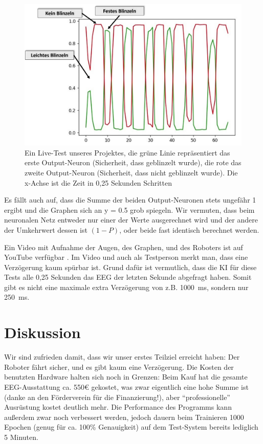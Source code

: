 \documentclass[11pt]{scrartcl}
\begin{document}
	\begin{figure}[h!]
		\includegraphics[width=\textwidth]{pictures/Test-Graph-annotated.png}
		\caption{Ein Live-Test unseres Projektes, die grüne Linie repräsentiert das erste Output-Neuron (Sicherheit, dass geblinzelt wurde), die rote das zweite Output-Neuron (Sicherheit, dass nicht geblinzelt wurde). Die x-Achse ist die Zeit in 0,25 Sekunden Schritten}
		\label{test-graph}
	\end{figure}

	Es fällt auch auf, dass die Summe der beiden Output-Neuronen stets ungefähr 1 ergibt und die Graphen sich an y = 0.5 grob spiegeln. Wir vermuten, dass beim neuronalen Netz entweder nur einer der Werte ausgerechnet wird und der andere der Umkehrwert dessen ist $\left(1 - P\right)$, oder beide fast identisch berechnet werden.
	
	Ein Video mit Aufnahme der Augen, des Graphen, und des Roboters ist auf YouTube verfügbar \cite{projekt-video}. Im Video und auch als Testperson merkt man, dass eine Verzögerung kaum spürbar ist. Grund dafür ist vermutlich, dass die KI für diese Tests alle 0,25 Sekunden das EEG der letzten Sekunde abgefragt  haben. Somit gibt es nicht eine maximale extra Verzögerung von z.B. \qty{1000}{\milli\second}, sondern nur \qty{250}{\milli\second}.

	\section{Diskussion}

	Wir sind zufrieden damit, dass wir unser erstes Teilziel erreicht haben: Der Roboter fährt sicher, und es gibt kaum eine Verzögerung. Die Kosten der benutzten Hardware halten sich noch in Grenzen: Beim Kauf hat die gesamte EEG-Ausstattung ca. 550€ gekostet, was zwar eigentlich eine hohe Summe ist (danke an den Förderverein für die Finanzierung!), aber \enquote{professionelle} Ausrüstung kostet deutlich mehr. Die Performance des Programms kann außerdem zwar noch verbessert werden, jedoch dauern beim Trainieren 1000 Epochen (genug für ca. 100\% Genauigkeit) auf dem Test-System bereits lediglich 5 Minuten. 
\end{document}
